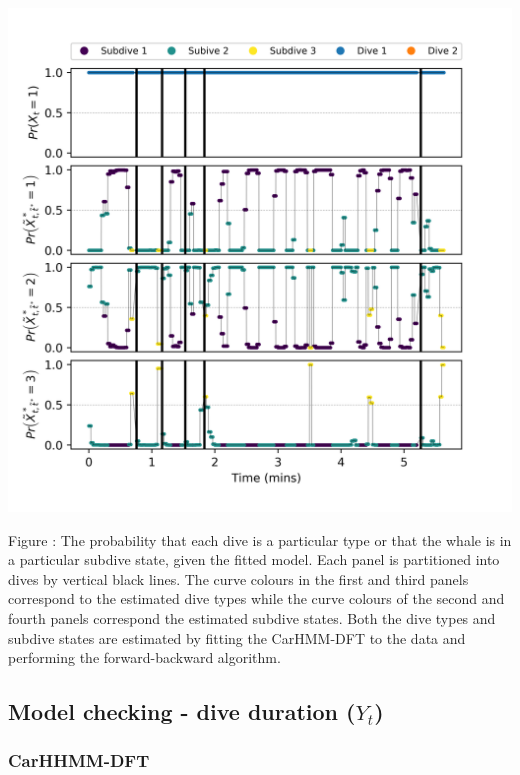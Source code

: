 \documentclass{article}
\begin{document}
        \begin{center}
        \includegraphics[width=6in]{../Plots/CarHMM_decoded_states.png}
        \end{center}
        
        \noindent Figure : The probability that each dive is a particular type or that the whale is in a particular subdive state, given the fitted model. Each panel is partitioned into dives by vertical black lines. The curve colours in the first and third panels correspond to the estimated dive types while the curve colours of the second and fourth panels correspond the estimated subdive states. Both the dive types and subdive states are estimated by fitting the CarHMM-DFT to the data and performing the forward-backward algorithm.
        \addtocounter{fignum}{1}
        
    \newpage
    \subsection{Model checking - dive duration ($Y_t$)}
    
        \subsubsection{CarHHMM-DFT}
        
\end{document}
